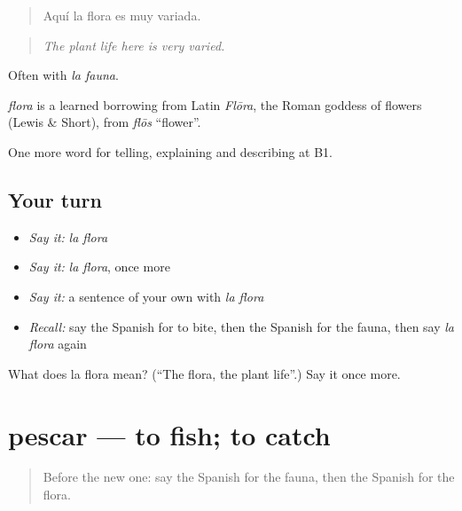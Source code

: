 \begin{quote}
Aquí la flora es muy variada.
\end{quote}

\begin{quote}
\emph{The plant life here is very varied.}
\end{quote}

Often with \emph{la fauna}.

\begin{cousinweb}
\emph{flora} is a learned borrowing from Latin \emph{Flōra}, the Roman goddess of flowers (Lewis \& Short), from \emph{flōs} \textquotedblleft{}flower\textquotedblright{}.
\end{cousinweb}

\begin{grammarlens}[title={What you've built}]
One more word for telling, explaining and describing at B1.
\end{grammarlens}

\subsection*{Your turn}
\begin{itemize}
\raggedright
  \item \emph{Say it:} \emph{la flora}
  \item \emph{Say it:} \emph{la flora}, once more
  \item \emph{Say it:} a sentence of your own with \emph{la flora}
  \item \emph{Recall:} say the Spanish for to bite, then the Spanish for the fauna, then say \emph{la flora} again
\end{itemize}

\begin{tcolorbox}[breakable,colback=teal!4,colframe=teal!35!black,title={Before you move on}]
What does la flora mean? (\textquotedblleft{}The flora, the plant life\textquotedblright{}.) Say it once more.
\end{tcolorbox}
\section[pescar]{pescar — to fish; to catch}

\label{lesson:ES-C695-pescar}



\begin{quote}
Before the new one: say the Spanish for the fauna, then the Spanish for the flora.
\end{quote}

